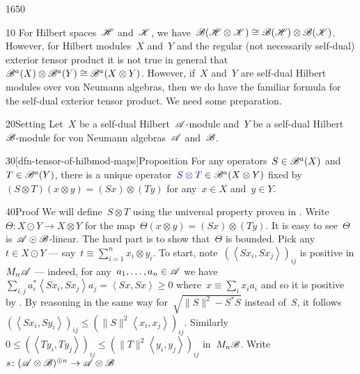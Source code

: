 \begin{parsec}{1650}%
\begin{point}{10}%
For Hilbert spaces~$\mathscr{H}$ and~$\mathscr{K}$,
    we have~$\mathscr{B}(\mathscr{H} \otimes \mathscr{K})
        \cong \mathscr{B}(\mathscr{H}) \otimes \mathscr{B}(\mathscr{K})$.
However, for Hilbert modules~$X$ and~$Y$
    and the regular (not necessarily self-dual)
        exterior tensor product
        it is not true in general
        that~$\mathscr{B}^a(X) \otimes \mathscr{B}^a(Y) \cong \mathscr{B}^a(X \otimes Y)$.
However, if~$X$ and~$Y$ are self-dual Hilbert modules over von Neumann
    algebras, then we do have the familiar formula
    for the self-dual exterior tensor product.
We need some preparation.
\end{point}
\begin{point}{20}{Setting}%
Let~$X$ be a self-dual Hilbert~$\mathscr{A}$-module
    and~$Y$ be a self-dual Hilbert~$\mathscr{B}$-module
    for von Neumann algebras~$\mathscr{A}$ and~$\mathscr{B}$.
\end{point}
\begin{point}{30}[dfn-tensor-of-hilbmod-maps]{Proposition}%
For any operators~$S \in \mathscr{B}^a(X)$ and~$T \in \mathscr{B}^a(Y)$,
there is a unique operator~$\Define{S \otimes T} \in \scrB^a(X\otimes Y)$%
    fixed by~$(S \otimes T) (x \otimes y) = (S x) \otimes (T y)$
    for any~$x\in X$ and~$y \in Y$.
\begin{point}{40}{Proof}%
We will define~$S \otimes T$ using the universal
    property proven in .
Write~$\Theta \colon X \odot Y \to X \otimes Y$
    for the map~$\Theta(x \otimes y) = (Sx) \otimes (Ty)$.
It is easy to see~$\Theta$ is~$\mathscr{A} \odot \mathscr{B}$-linear.
The hard part is to show that~$\Theta$ is bounded.
Pick any~$t \in X \odot Y$ --- say~$t \equiv \sum^n_{i=1} x_i \otimes y_i$.
To start, note~$(\left<Sx_i, Sx_j\right>)_{ij}$ is positive in $M_n \mathscr{A}$ ---
    indeed, for any~$a_1, \ldots, a_n \in \mathscr{A}$
    we have~$\sum_{i,j} a_i^* \left<S x_i, S x_j\right> a_j
            = \left<Sx,Sx\right> \geq 0$
                where~$x \equiv \sum_i x_i a_i$
                and so it is positive
                by .
By reasoning in the same way for~$\sqrt{\|S\|^2 - S^*S}$
instead of~$S$,
it follows~$(\left<Sx_i, Sy_i \right>)_{ij} \leq (\|S\|^2 \left<x_i,x_j\right>)_{ij}$.
Similarly~$0 \leq (\left<Ty_i, Ty_j\right>)_{ij} \leq (\|T\|^2 \left<y_i, y_j\right>)_{ij}$ in~$M_n \mathscr{B}$.
Write~$s\colon (\mathscr{A} \otimes \mathscr{B})^{\oplus n} \to \mathscr{A} \otimes \mathscr{B}$

\end{point}
\end{point}
\end{parsec}
